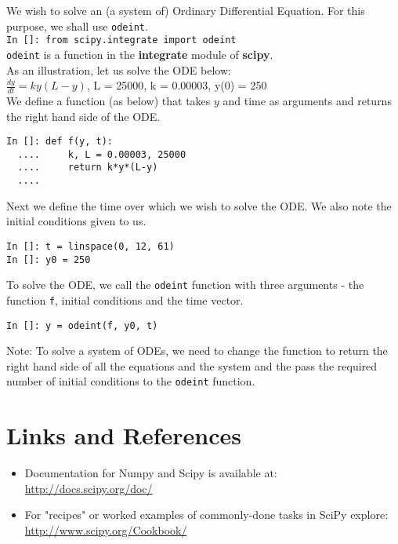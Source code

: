 \documentclass[12pt]{article}
\newcommand{\typ}[1]{\lstinline{#1}}
\begin{document}
We wish to solve an (a system of) Ordinary Differential Equation. For this purpose, we shall use \typ{odeint}.\\
\typ{In []: from scipy.integrate import odeint}\\
\typ{odeint} is a function in the \textbf{integrate} module of \textbf{scipy}.\\
As an illustration, let us solve the ODE below:\\
$\frac{dy}{dt} = ky(L-y)$, L = 25000, k = 0.00003, y(0) = 250\\
We define a function (as below) that takes $y$ and time as arguments and returns the right hand side of the ODE.
\begin{lstlisting}
In []: def f(y, t):
  ....     k, L = 0.00003, 25000
  ....     return k*y*(L-y)
  ....
\end{lstlisting}
Next we define the time over which we wish to solve the ODE. We also note the initial conditions given to us.
\begin{lstlisting}
In []: t = linspace(0, 12, 61)
In []: y0 = 250
\end{lstlisting}
To solve the ODE, we call the \typ{odeint} function with three arguments - the function \typ{f}, initial conditions and the time vector. 
\begin{lstlisting}
In []: y = odeint(f, y0, t)
\end{lstlisting}
Note: To solve a system of ODEs, we need to change the function to return the right hand side of all the equations and the system and the pass the required number of initial conditions to the \typ{odeint} function.
\section{Links and References}
\begin{itemize}
\item Documentation for Numpy and Scipy is available at: \url{http://docs.scipy.org/doc/}
  \item For "recipes" or worked examples of commonly-done tasks in SciPy explore: \url{http://www.scipy.org/Cookbook/}
\end{itemize}
\end{document}
